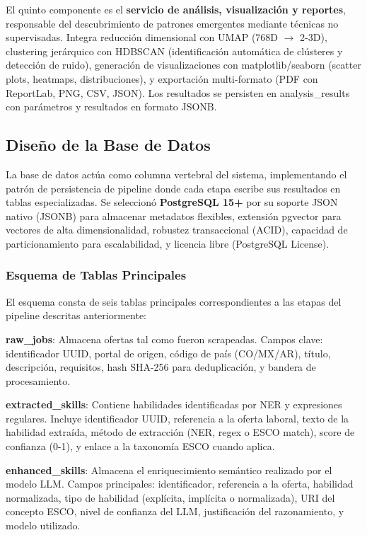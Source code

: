 El quinto componente es el \textbf{servicio de análisis, visualización y reportes}, responsable del descubrimiento de patrones emergentes mediante técnicas no supervisadas. Integra reducción dimensional con UMAP (768D $\rightarrow$ 2-3D), clustering jerárquico con HDBSCAN (identificación automática de clústeres y detección de ruido), generación de visualizaciones con matplotlib/seaborn (scatter plots, heatmaps, distribuciones), y exportación multi-formato (PDF con ReportLab, PNG, CSV, JSON). Los resultados se persisten en analysis\_results con parámetros y resultados en formato JSONB.

\subsection{Diseño de la Base de Datos}

La base de datos actúa como columna vertebral del sistema, implementando el patrón de persistencia de pipeline donde cada etapa escribe sus resultados en tablas especializadas. Se seleccionó \textbf{PostgreSQL 15+} por su soporte JSON nativo (JSONB) para almacenar metadatos flexibles, extensión pgvector para vectores de alta dimensionalidad, robustez transaccional (ACID), capacidad de particionamiento para escalabilidad, y licencia libre (PostgreSQL License).

\subsubsection{Esquema de Tablas Principales}

El esquema consta de seis tablas principales correspondientes a las etapas del pipeline descritas anteriormente:

\textbf{raw\_jobs}: Almacena ofertas tal como fueron scrapeadas. Campos clave: identificador UUID, portal de origen, código de país (CO/MX/AR), título, descripción, requisitos, hash SHA-256 para deduplicación, y bandera de procesamiento.

\textbf{extracted\_skills}: Contiene habilidades identificadas por NER y expresiones regulares. Incluye identificador UUID, referencia a la oferta laboral, texto de la habilidad extraída, método de extracción (NER, regex o ESCO match), score de confianza (0-1), y enlace a la taxonomía ESCO cuando aplica.

\textbf{enhanced\_skills}: Almacena el enriquecimiento semántico realizado por el modelo LLM. Campos principales: identificador, referencia a la oferta, habilidad normalizada, tipo de habilidad (explícita, implícita o normalizada), URI del concepto ESCO, nivel de confianza del LLM, justificación del razonamiento, y modelo utilizado.

